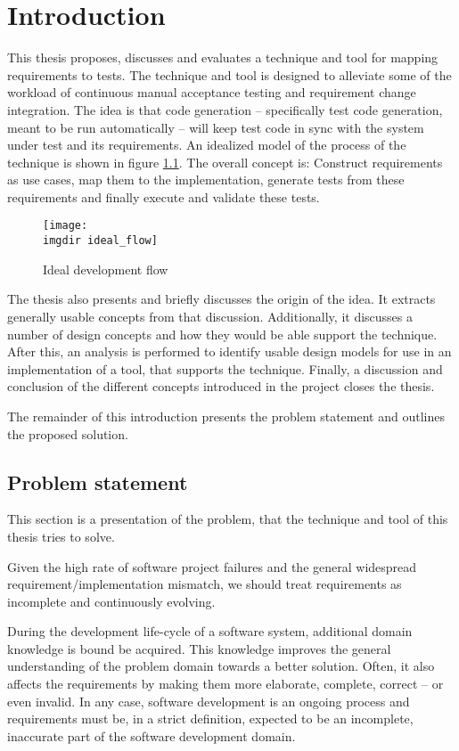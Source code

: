 \chapter{Introduction}
This thesis proposes, discusses and evaluates a technique and tool for mapping requirements to tests. The technique and tool is designed to alleviate some of the workload of continuous manual acceptance testing and requirement change integration. The idea is that code generation -- specifically test code generation, meant to be run automatically -- will keep test code in sync with the system under test and its requirements.  An idealized model of the process of the technique is shown in figure \ref{fig:ideal_flow}. The overall concept is: Construct requirements as use cases, map them to the implementation, generate tests from these requirements and finally execute and validate these tests.\medskip

\begin{figure}[!htbp]
\centering
\texttt{[image: \\imgdir ideal\_flow]}
\caption{Ideal development flow}
\label{fig:ideal_flow}
\end{figure}

\noindent
The thesis also presents and briefly discusses the origin of the idea. It extracts generally usable concepts from that discussion. Additionally, it discusses a number of design concepts and how they would be able support the technique. After this, an analysis is performed to identify usable design models for use in an implementation of a tool, that supports the technique. Finally, a discussion and conclusion of the different concepts introduced in the project closes the thesis.\medskip

\noindent
The remainder of this introduction presents the problem statement and outlines the proposed solution.

\section{Problem statement}
This section is a presentation of the problem, that the technique and tool of this thesis tries to solve.\medskip

\noindent
Given the high rate of software project failures\cite{verner2008}\cite{charette2005} and the general widespread requirement/implementation mismatch, we should treat requirements as incomplete and continuously evolving.\medskip

\noindent
During the development life-cycle of a software system, additional domain knowledge is bound be acquired. This knowledge improves the general understanding of the problem domain towards a better solution. Often, it also affects the requirements by making them more elaborate, complete, correct -- or even invalid. In any case, software development is an ongoing process and requirements must be, in a strict definition, expected to be an incomplete, inaccurate part of the software development domain.\medskip

